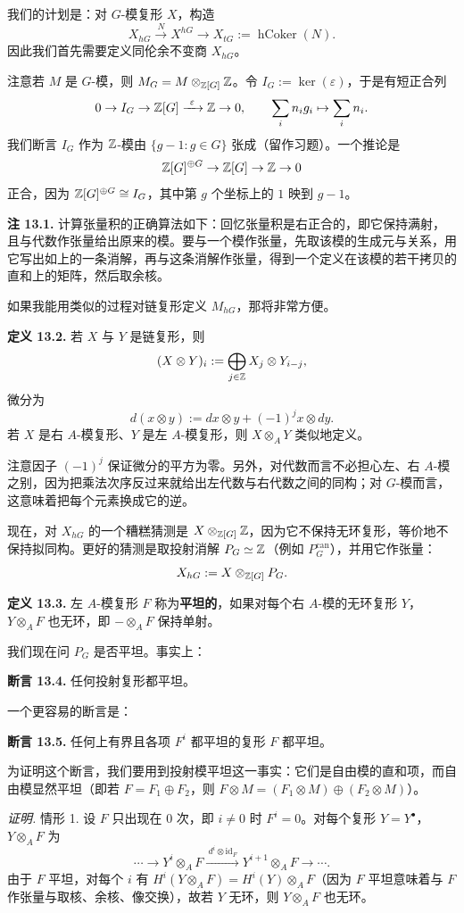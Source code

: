 我们的计划是：对 $G$-模复形 $X$，构造
\[
X_{hG}\xrightarrow{\ N\ }X^{hG}\longrightarrow X_{tG}:=\operatorname{hCoker}(N).
\]
因此我们首先需要定义同伦余不变商 $X_{hG}$。

注意若 $M$ 是 $G$-模，则 $M_{G}=M\otimes_{\mathbb{Z}[G]}\mathbb{Z}$。令 $I_{G}:=\ker(\varepsilon)$，于是有短正合列
\[
0\to I_{G}\to\Z[G]\xrightarrow{\ \varepsilon\ }\Z\to 0,\qquad \sum_{i}n_{i}g_{i}\mapsto\sum_{i}n_{i}.
\]
我们断言 $I_{G}$ 作为 $\mathbb{Z}$-模由 $\{g-1:g\in G\}$ 张成（留作习题）。一个推论是
\[
\mathbb{Z}[G]^{\oplus G}\to\mathbb{Z}[G]\to\mathbb{Z}\to 0
\]
正合，因为 $\mathbb{Z}[G]^{\oplus G}\cong I_{G}$，其中第 $g$ 个坐标上的 $1$ 映到 $g-1$。

\textbf{注 13.1.} 计算张量积的正确算法如下：回忆张量积是右正合的，即它保持满射，且与代数作张量给出原来的模。要与一个模作张量，先取该模的生成元与关系，用它写出如上的一条消解，再与这条消解作张量，得到一个定义在该模的若干拷贝的直和上的矩阵，然后取余核。

如果我能用类似的过程对链复形定义 $M_{hG}$，那将非常方便。

\textbf{定义 13.2.} 若 $X$ 与 $Y$ 是链复形，则
\[
(X\otimes Y)_{i}:=\bigoplus_{j\in\mathbb{Z}}X_{j}\otimes Y_{i-j},
\]
微分为
\[
d(x\otimes y):=dx\otimes y+(-1)^{j}x\otimes dy.
\]
若 $X$ 是右 $A$-模复形、$Y$ 是左 $A$-模复形，则 $X\otimes_{A}Y$ 类似地定义。

注意因子 $(-1)^{j}$ 保证微分的平方为零。另外，对代数而言不必担心左、右 $A$-模之别，因为把乘法次序反过来就给出左代数与右代数之间的同构；对 $G$-模而言，这意味着把每个元素换成它的逆。

现在，对 $X_{hG}$ 的一个糟糕猜测是 $X\otimes_{\mathbb{Z}[G]}\mathbb{Z}$，因为它不保持无环复形，等价地不保持拟同构。更好的猜测是取投射消解 $P_{G}\simeq\mathbb{Z}$（例如 $P_G^{\mathrm{can}}$），并用它作张量：
\[
X_{hG}:=X\otimes_{\mathbb{Z}[G]}P_{G}.
\]

\textbf{定义 13.3.} 左 $A$-模复形 $F$ 称为\textbf{平坦的}，如果对每个右 $A$-模的无环复形 $Y$，$Y\otimes_{A}F$ 也无环，即 $-\otimes_{A}F$ 保持单射。

我们现在问 $P_{G}$ 是否平坦。事实上：

\textbf{断言 13.4.} 任何投射复形都平坦。

一个更容易的断言是：

\textbf{断言 13.5.} 任何上有界且各项 $F^{i}$ 都平坦的复形 $F$ 都平坦。

为证明这个断言，我们要用到投射模平坦这一事实：它们是自由模的直和项，而自由模显然平坦（即若 $F=F_{1}\oplus F_{2}$，则 $F\otimes M=(F_{1}\otimes M)\oplus(F_{2}\otimes M)$）。

\textit{证明.} 情形 1. 设 $F$ 只出现在 $0$ 次，即 $i\neq 0$ 时 $F^{i}=0$。对每个复形 $Y=Y^{\bullet}$，$Y\otimes_{A}F$ 为
\[
\cdots\to Y^{i}\otimes_{A}F\xrightarrow{\ d^{i}\otimes\mathrm{id}_{F}\ }Y^{i+1}\otimes_{A}F\to\cdots.
\]
由于 $F$ 平坦，对每个 $i$ 有 $H^{i}(Y\otimes_{A}F)=H^{i}(Y)\otimes_{A}F$（因为 $F$ 平坦意味着与 $F$ 作张量与取核、余核、像交换），故若 $Y$ 无环，则 $Y\otimes_{A}F$ 也无环。

